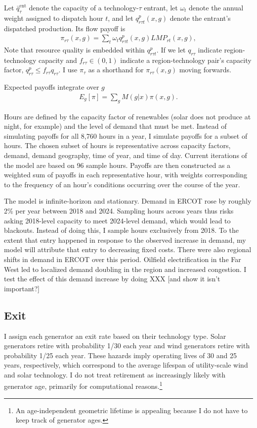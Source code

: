 \documentclass[12pt]{article}
\begin{document}
Let $\bar q_\tau^{\mathrm{ent}}$ denote the capacity of a technology-$\tau$ entrant, let $\omega_t$ denote the annual weight assigned to dispatch hour $t$, and let $q^p_{r\tau t}(x,g)$ denote the entrant's dispatched production. Its flow payoff is
\begin{align}
    \pi_{r\tau}(x,g)
    = \sum_t \omega_t q^p_{r\tau t}(x,g)LMP_{rt}(x,g),
\end{align}
Note that resource quality is embedded within $q^p_{r\tau t}$. If we let $q_{r\tau}$ indicate region-technology capacity and $f_{r\tau} \in (0,1)$ indicate a region-technology pair's capacity factor, $q^p_{r\tau} \leq f_{r\tau}q_{r\tau}$. I use $\pi_\tau$ as a shorthand for $\pi_{r\tau}(x,g)$ moving forwards. 

Expected payoffs integrate over $g$
\begin{align}
    E_g[\pi] = \sum_g M(g|x) \pi(x,g).
\end{align} 

Hours are defined by the capacity factor of renewables (solar does not produce at night, for example) and the level of demand that must be met. Instead of simulating payoffs for all 8,760 hours in a year, I simulate payoffs for a subset of hours. The chosen subset of hours is representative across capacity factors, demand, demand geography, time of year, and time of day. Current iterations of the model are based on 96 sample hours. Payoffs are then constructed as a weighted sum of payoffs in each representative hour, with weights corresponding to the frequency of an hour's conditions occurring over the course of the year. 

The model is infinite-horizon and stationary. Demand in ERCOT rose by roughly 2\% per year between 2018 and 2024. Sampling hours across years thus risks asking 2018-level capacity to meet 2024-level demand, which would lead to blackouts. Instead of doing this, I sample hours exclusively from 2018. To the extent that entry happened in response to the observed increase in demand, my model will attribute that entry to decreasing fixed costs. There were also regional shifts in demand in ERCOT over this period. Oilfield electrification in the Far West led to localized demand doubling in the region and increased congestion. I test the effect of this demand increase by doing XXX [and show it isn't important?]

\subsection{Exit}
\label{sec:exit}
I assign each generator an exit rate based on their technology type. Solar generators retire with probability 1/30 each year and wind generators retire with probability 1/25 each year. These hazards imply operating lives of 30 and 25 years, respectively, which correspond to the average lifespan of utility-scale wind and solar technology. I do not treat retirement as increasingly likely with generator age, primarily for computational reasons.\footnote{An age-independent geometric lifetime is appealing because I do not have to keep track of generator ages.} 
\end{document}
